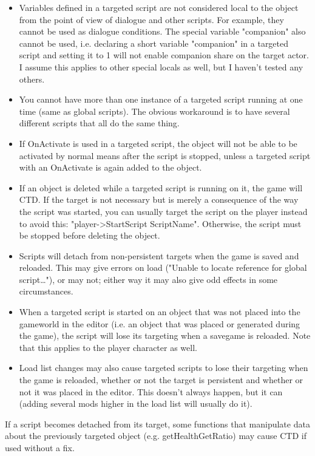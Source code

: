 \begin{itemize}
\item
  Variables defined in a targeted script are not considered local to the
  object from the point of view of dialogue and other scripts. For
  example, they cannot be used as dialogue conditions. The special
  variable "companion" also cannot be used, i.e. declaring a short
  variable "companion" in a targeted script and setting it to 1 will not
  enable companion share on the target actor. I assume this applies to
  other special locals as well, but I haven't tested any others.
\item
  You cannot have more than one instance of a targeted script running at
  one time (same as global scripts). The obvious workaround is to have
  several different scripts that all do the same thing.
\item
  If OnActivate is used in a targeted script, the object will not be
  able to be activated by normal means after the script is stopped,
  unless a targeted script with an OnActivate is again added to the
  object.
\item
  If an object is deleted while a targeted script is running on it, the
  game will CTD. If the target is not necessary but is merely a
  consequence of the way the script was started, you can usually target
  the script on the player instead to avoid this:
  "player-\textgreater StartScript ScriptName". Otherwise, the script
  must be stopped before deleting the object.
\item
  Scripts will detach from non-persistent targets when the game is saved
  and reloaded. This may give errors on load ("Unable to locate
  reference for global script\ldots"), or may not; either way it may
  also give odd effects in some circumstances.
\item
  When a targeted script is started on an object that was not placed
  into the gameworld in the editor (i.e. an object that was placed or
  generated during the game), the script will lose its targeting when a
  savegame is reloaded. Note that this applies to the player character
  as well.
\item
  Load list changes may also cause targeted scripts to lose their
  targeting when the game is reloaded, whether or not the target is
  persistent and whether or not it was placed in the editor. This
  doesn't always happen, but it can (adding several mods higher in the
  load list will usually do it).
\end{itemize}

If a script becomes detached from its target, some functions that
manipulate data about the previously targeted object (e.g.
getHealthGetRatio) may cause CTD if used without a fix.

